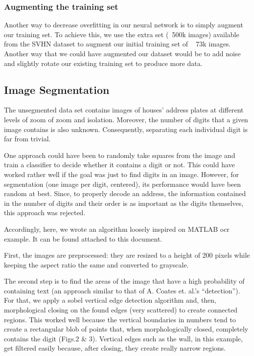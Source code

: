 \documentclass{article} %
\begin{document}
\subsubsection{Augmenting the training set}
Another way to decrease overfitting in our neural network is to simply augment our training set. To achieve this, we use the extra set (~500k images) available from the SVHN dataset to augment our initial training set of ~ 73k images. Another way that we could have augmented our dataset would be to add noise and slightly rotate our existing training set to produce more data. 

\subsection{Image Segmentation}
The unsegmented data set contains images of houses’ address plates at different levels of zoom of zoom and isolation. Moreover, the number of digits that a given image contains is also unknown. Consequently, separating each individual digit is far from trivial.

One approach could have been to randomly take squares from the image and train a classifier to decide whether it contains a digit or not. This could have worked rather well if the goal was just to find digits in an image. However, for segmentation (one image per digit, centered), its performance would have been random at best. Since, to properly decode an address, the information contained in the number of digits and their order is as important as the digits themselves, this approach was rejected.

Accordingly, here, we wrote an algorithm loosely inspired on MATLAB ocr example. It can be found attached to this document.

First, the images are preprocessed: they are resized to a height of 200 pixels while keeping the aspect ratio the same and converted to grayscale.

The second step is to find the areas of the image that have a high probability of containing text (an approach similar to that of A. Coates et. al.’s “detection”). For that, we apply a sobel vertical edge detection algorithm and, then, morphological closing on the found edges (very scattered) to create connected regions. This worked well because the vertical boundaries in numbers tend to create a rectangular blob of points that, when morphologically closed, completely contains the digit (Figs.2 \& 3). Vertical edges such as the wall, in this example, get filtered easily because, after closing, they create really narrow regions. 
\end{document}
